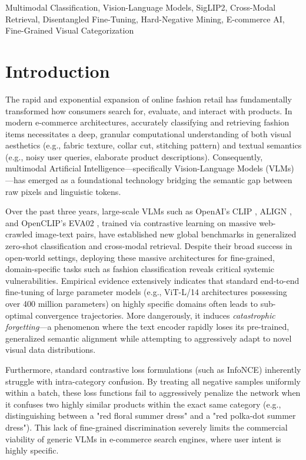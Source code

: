 \documentclass[conference]{IEEEtran}
\begin{document}
\begin{IEEEkeywords}
\sloppy
Multimodal Classification, Vision-Language Models, SigLIP2, Cross-Modal Retrieval, Disentangled Fine-Tuning, Hard-Negative Mining, E-commerce AI, Fine-Grained Visual Categorization
\end{IEEEkeywords}

\section{Introduction}
The rapid and exponential expansion of online fashion retail has fundamentally transformed how consumers search for, evaluate, and interact with products. In modern e-commerce architectures, accurately classifying and retrieving fashion items necessitates a deep, granular computational understanding of both visual aesthetics (e.g., fabric texture, collar cut, stitching pattern) and textual semantics (e.g., noisy user queries, elaborate product descriptions). Consequently, multimodal Artificial Intelligence---specifically Vision-Language Models (VLMs)---has emerged as a foundational technology bridging the semantic gap between raw pixels and linguistic tokens.

Over the past three years, large-scale VLMs such as OpenAI's CLIP \cite{radford2021learning}, ALIGN \cite{jia2021scaling}, and OpenCLIP's EVA02 \cite{fang2023eva}, trained via contrastive learning on massive web-crawled image-text pairs, have established new global benchmarks in generalized zero-shot classification and cross-modal retrieval. Despite their broad success in open-world settings, deploying these massive architectures for fine-grained, domain-specific tasks such as fashion classification reveals critical systemic vulnerabilities. Empirical evidence extensively indicates that standard end-to-end fine-tuning of large parameter models (e.g., ViT-L/14 architectures possessing over 400 million parameters) on highly specific domains often leads to sub-optimal convergence trajectories. More dangerously, it induces \textit{catastrophic forgetting}---a phenomenon where the text encoder rapidly loses its pre-trained, generalized semantic alignment while attempting to aggressively adapt to novel visual data distributions. 

Furthermore, standard contrastive loss formulations (such as InfoNCE) inherently struggle with intra-category confusion. By treating all negative samples uniformly within a batch, these loss functions fail to aggressively penalize the network when it confuses two highly similar products within the exact same category (e.g., distinguishing between a "red floral summer dress" and a "red polka-dot summer dress"). This lack of fine-grained discrimination severely limits the commercial viability of generic VLMs in e-commerce search engines, where user intent is highly specific.
\end{document}
